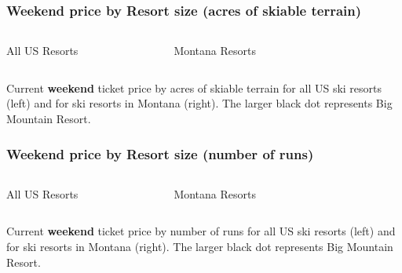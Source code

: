 \documentclass{beamer}
\begin{document}
\begin{frame} 
\frametitle{Weekend price by Resort size (acres of skiable terrain)}
\begin{columns}

\column{2in}
\begin{center}
All US Resorts
\end{center}
\begin{figure}
\end{figure}

\column{2in}
\begin{center}
Montana Resorts
\end{center}
\begin{figure}
\end{figure}

\end{columns}
\begin{center}
Current \textbf{weekend} ticket price by acres of skiable terrain for all US ski resorts (left) and for ski resorts in Montana (right). The larger black dot represents Big Mountain Resort.
\end{center}

\end{frame}
\begin{frame} 
\frametitle{Weekend price by Resort size (number of runs)}
\begin{columns}

\column{2in}
\begin{center}
All US Resorts
\end{center}
\begin{figure}
\end{figure}

\column{2in}
\begin{center}
Montana Resorts
\end{center}
\begin{figure}
\end{figure}

\end{columns}
\begin{center}
Current \textbf{weekend} ticket price by number of runs for all US ski resorts (left) and for ski resorts in Montana (right). The larger black dot represents Big Mountain Resort.
\end{center}
\end{frame}
\end{document}
